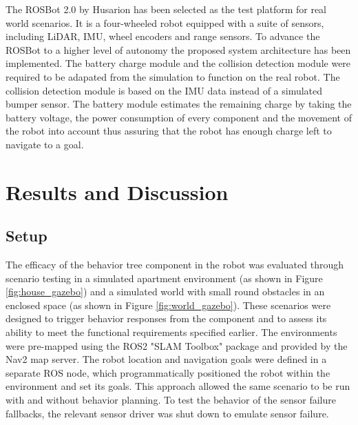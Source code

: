 \documentclass[letterpaper, 10pt, conference]{ieeeconf}
\begin{document}
The ROSBot 2.0 by Husarion has been selected as the test platform for real world scenarios. It is a four-wheeled robot equipped with a suite of sensors, including LiDAR, IMU, wheel encoders and range sensors. To advance the ROSBot to a higher level of autonomy the proposed system architecture has been implemented. The battery charge module and the collision detection module were required to be adapated from the simulation to function on the real robot. The collision detection module is based on the IMU data instead of a simulated bumper sensor. The battery module estimates the remaining charge by taking the battery voltage, the power consumption of every component and the movement of the robot into account thus assuring that the robot has enough charge left to navigate to a goal.



\section{Results and Discussion}
\label{sec:ResultsAndDiscussion}

\subsection{Setup}

The efficacy of the behavior tree component in the robot was evaluated through scenario testing in a simulated apartment environment (as shown in Figure \ref{fig:house_gazebo}) and a simulated world with small round obstacles in an enclosed space (as shown in Figure \ref{fig:world_gazebo}). These scenarios were designed to trigger behavior responses from the component and to assess its ability to meet the functional requirements specified earlier. The environments were pre-mapped using the ROS2 "SLAM Toolbox" package and provided by the Nav2 map server. The robot location and navigation goals were defined in a separate ROS node, which programmatically positioned the robot within the environment and set its goals. This approach allowed the same scenario to be run with and without behavior planning. To test the behavior of the sensor failure fallbacks, the relevant sensor driver was shut down to emulate sensor failure.
\end{document}
